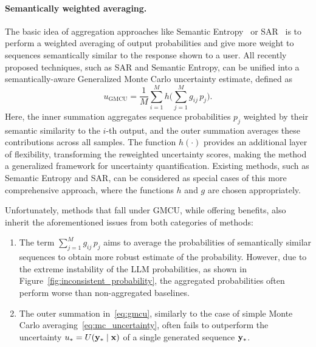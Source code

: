\paragraph{Semantically weighted averaging.}
  The basic idea of aggregation approaches like Semantic Entropy~\cite{kuhn2023semantic} or SAR~\cite{duan-etal-2024-shifting} is to perform a weighted averaging of output probabilities and give more weight to sequences semantically similar to the response shown to a user. All recently proposed techniques, such as SAR and Semantic Entropy, can be unified into a semantically-aware Generalized Monte Carlo uncertainty estimate, defined as
  \begin{equation}
    u_{\text{GMCU}} = \frac{1}{M}\sum_{i = 1}^M h \Biggl(\sum_{j = 1}^M g_{ij} \, p_j\Biggr).
  \label{eq:gmcu}
  \end{equation}
  Here, the inner summation aggregates sequence probabilities \(p_j\) weighted by their semantic similarity to the \(i\)-th output, and the outer summation averages these contributions across all samples. The function $h(\cdot)$ provides an additional layer of flexibility, transforming the reweighted uncertainty scores, making the method a generalized framework for uncertainty quantification. Existing methods, such as Semantic Entropy and SAR, can be considered as special cases of this more comprehensive approach, where the functions \(h\) and \( g \) are chosen appropriately.

  Unfortunately, methods that fall under GMCU, while offering benefits, also inherit the aforementioned issues from both categories of methods:
  \begin{enumerate}
    \item The term \(\sum_{j = 1}^M g_{ij} \, p_j\) aims to average the probabilities of semantically similar sequences to obtain more robust estimate of the probability. However, due to the extreme instability of the LLM probabilities, as shown in Figure~\ref{fig:inconsistent_probability}, the aggregated probabilities often perform worse than non-aggregated baselines.

    \item The outer summation in~\eqref{eq:gmcu}, similarly to the case of simple Monte Carlo averaging~\eqref{eq:mc_uncertainty}, often fails to outperform the uncertainty $u_* = U(\mathbf{y}_* \mid \mathbf{x})$ of a single generated sequence $\mathbf{y}_*$.
  \end{enumerate}

